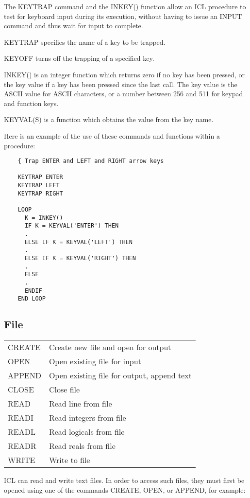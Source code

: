 The KEYTRAP command and the INKEY() function allow an ICL procedure to test
for keyboard input during its execution, without having to issue an INPUT
command and thus wait for input to complete.

KEYTRAP specifies the name of a key to be trapped.

KEYOFF turns off the trapping of a specified key.

INKEY() is an integer function which returns zero if no key has been pressed, or
the key value if a key has been pressed since the last call.
The key value is the ASCII value for ASCII characters, or a number between 256
and 511 for keypad and function keys.

KEYVAL(S) is a function which obtains the value from the key name.

Here is an example of the use of these commands and functions within a
procedure:

\begin{small}
\begin{verbatim}
    { Trap ENTER and LEFT and RIGHT arrow keys

    KEYTRAP ENTER
    KEYTRAP LEFT
    KEYTRAP RIGHT

    LOOP
      K = INKEY()
      IF K = KEYVAL('ENTER') THEN
      .
      ELSE IF K = KEYVAL('LEFT') THEN
      .
      ELSE IF K = KEYVAL('RIGHT') THEN
      .
      ELSE
      .
      ENDIF
    END LOOP
\end{verbatim}
\end{small}

\subsection{File}

\begin{center}
\begin{tabular}{|l|l|}
\hline
CREATE   & Create new file and open for output \\
OPEN     & Open existing file for input \\
APPEND   & Open existing file for output, append text \\
CLOSE    & Close file \\
\hline
READ     & Read line from file \\
READI    & Read integers from file \\
READL    & Read logicals from file \\
READR    & Read reals from file \\
\hline
WRITE    & Write to file \\
\hline
\end{tabular}
\end{center}
ICL can read and write text files.
In order to access such files, they must first be opened using one of the
commands CREATE, OPEN, or APPEND, for example:

